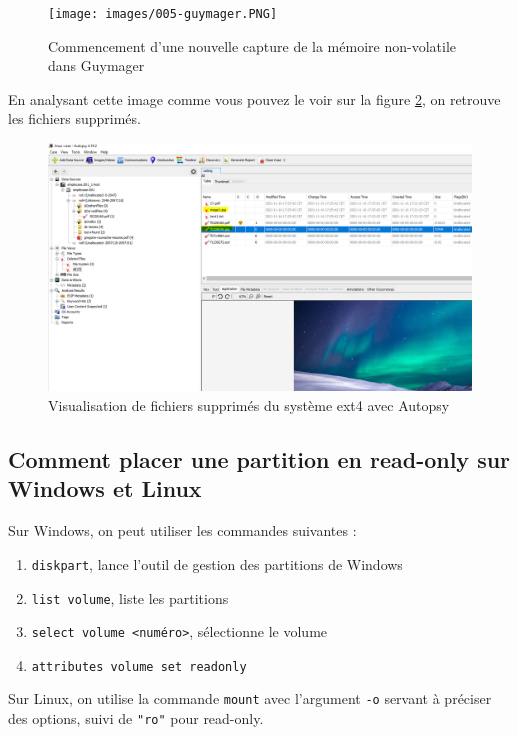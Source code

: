 \documentclass[a4paper]{article}
\begin{document}
\begin{figure}[H]
    \centering
    \texttt{[image: images/005-guymager.PNG]}
    \caption{Commencement d'une nouvelle capture de la mémoire non-volatile dans Guymager}
    \label{fig:005ftk}
\end{figure}

En analysant cette image comme vous pouvez le voir sur la figure \ref{fig:006ftk}, on retrouve les fichiers supprimés.

\begin{figure}[H]
    \centering
    \includegraphics[width=0.99\linewidth]{images/006-autopsy.PNG}
    \caption{Visualisation de fichiers supprimés du système ext4 avec Autopsy}
    \label{fig:006ftk}
\end{figure}



\subsection{Comment placer une partition en read-only sur Windows et Linux}

Sur Windows, on peut utiliser les commandes suivantes \cite{1}: 
\begin{enumerate}
    \item {\small \texttt{diskpart}}, lance l'outil de gestion des partitions de Windows
    \item {\small \texttt{list volume}}, liste les partitions
    \item {\small \texttt{select volume <numéro>}}, sélectionne le volume
    \item {\small \texttt{attributes volume set readonly}}
\end{enumerate}

Sur Linux, on utilise la commande {\small \texttt{mount}} avec l'argument {\small \texttt{-o}} servant à préciser des options, suivi de {\small \texttt{"ro"}} pour read-only.
\end{document}

